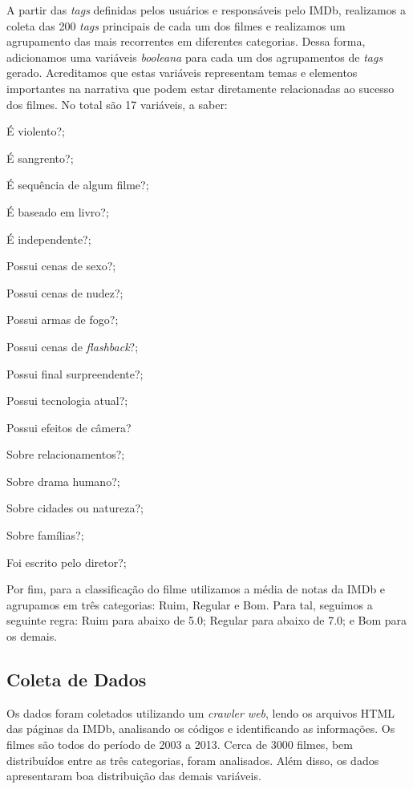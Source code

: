 \documentclass[twoside]{article}
\begin{document}
\begin{multicols}{2}
A partir das \textit{tags} definidas pelos usuários e responsáveis pelo IMDb, realizamos a coleta das 200 \textit{tags} principais de cada um dos filmes e realizamos um agrupamento das mais recorrentes em diferentes categorias. Dessa forma, adicionamos uma variáveis \textit{booleana} para cada um dos agrupamentos de \textit{tags} gerado. Acreditamos que estas variáveis representam temas e elementos importantes na narrativa que podem estar diretamente relacionadas ao sucesso dos filmes. No total são 17 variáveis, a saber:
\\
\begin{compactitem}
\item É violento?;
\item É sangrento?;
\item É sequência de algum filme?;
\item É baseado em livro?;
\item É independente?;
\item Possui cenas de sexo?;
\item Possui cenas de nudez?;
\item Possui armas de fogo?;
\item Possui cenas de \textit{flashback}?;
\item Possui final surpreendente?;
\item Possui tecnologia atual?;
\item Possui efeitos de câmera?
\item Sobre relacionamentos?;
\item Sobre drama humano?;
\item Sobre cidades ou natureza?;
\item Sobre famílias?;
\item Foi escrito pelo diretor?; \\
\end{compactitem}

Por fim, para a classificação do filme utilizamos a média de notas da IMDb e agrupamos em três categorias: Ruim, Regular e Bom. Para tal, seguimos a seguinte regra: Ruim para abaixo de 5.0; Regular para abaixo de 7.0; e Bom para os demais.

\subsection{Coleta de Dados}
Os dados foram coletados utilizando um \textit{crawler web}, lendo os arquivos HTML das páginas da IMDb, analisando os códigos e identificando as informações. Os filmes são todos do período de 2003 a 2013. Cerca de 3000 filmes, bem distribuídos entre as três categorias, foram analisados. Além disso, os dados apresentaram boa distribuição das demais variáveis.


\end{multicols}
\end{document}
